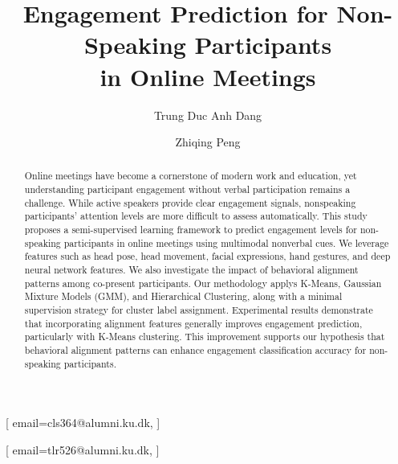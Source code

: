 \documentclass[
]{ceurart}
\begin{document}
\title{\texorpdfstring{Engagement Prediction for Non-Speaking Participants\\in Online Meetings}{Engagement Prediction for Non-Speaking Participants in Online Meetings}}



\author[1]{Trung Duc Anh Dang}[%
email=cls364@alumni.ku.dk,
]
\author[1]{Zhiqing Peng}[%
email=tlr526@alumni.ku.dk,
]


\address[1]{University of Copenhagen, Denmark}



\begin{abstract}
 Online meetings have become a cornerstone of modern work and education, yet understanding participant engagement without verbal participation remains a challenge. While active speakers provide clear engagement signals, nonspeaking participants' attention levels are more difficult to assess automatically. This study proposes a semi-supervised learning framework to predict engagement levels for non-speaking participants in online meetings using multimodal nonverbal cues. We leverage features such as head pose, head movement, facial expressions, hand gestures, and deep neural network features. We also investigate the impact of behavioral alignment patterns among co-present participants. Our methodology applys K-Means, Gaussian Mixture Models (GMM), and Hierarchical Clustering, along with a minimal supervision strategy for cluster label assignment. Experimental results demonstrate that incorporating alignment features generally improves engagement prediction, particularly with K-Means clustering. This improvement supports our hypothesis that behavioral alignment patterns can enhance engagement classification accuracy for non-speaking participants.
\end{abstract}




\maketitle
\end{document}
